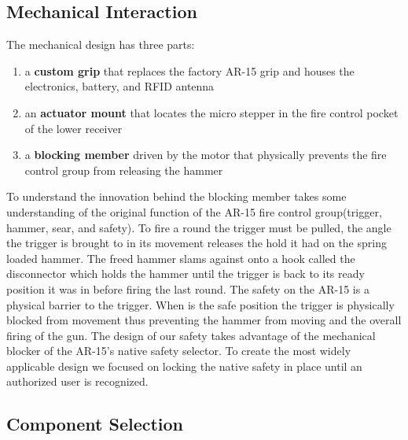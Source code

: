 \subsection{Mechanical Interaction}
The mechanical design has three parts:
\begin{enumerate}
    \item a \textbf{custom grip} that replaces the factory AR-15 grip and
    houses the electronics, battery, and RFID antenna
    \item an \textbf{actuator mount} that locates the micro stepper in the fire
    control pocket of the lower receiver
    \item a \textbf{blocking member} driven by the motor that physically
    prevents the fire control group from releasing the hammer
\end{enumerate}

To understand the innovation behind the blocking member takes some understanding of the original function of the 
    AR-15 fire control group(trigger, hammer, sear, and safety). To fire a round the trigger must be pulled, the angle the 
    trigger is brought to in its movement releases the hold it had on the spring loaded hammer. The freed hammer slams against
    onto a hook called the disconnector which holds the hammer until the trigger is back to its ready position it was in before 
    firing the last round. The safety on the AR-15 is a physical barrier to the trigger. When is the safe position the trigger
    is physically blocked from movement thus preventing the hammer from moving and the overall firing of the gun. The design 
    of our safety takes advantage of the mechanical blocker of the AR-15's native safety selector. To create the most widely 
    applicable design we focused on locking the native safety in place until an authorized user is recognized.

\subsection{Component Selection}

